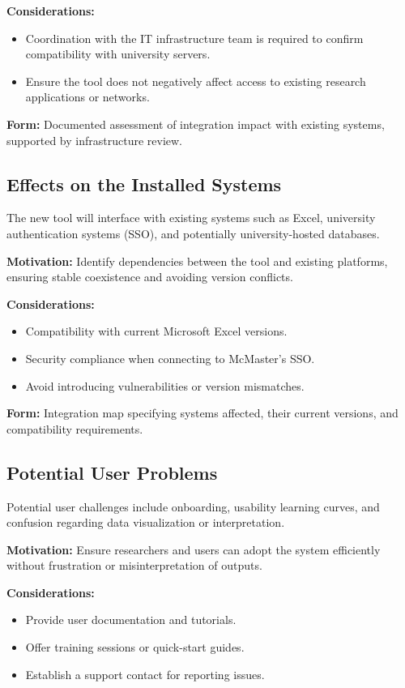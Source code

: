 \documentclass[12pt]{article}
\begin{document}
\textbf{Considerations:}
\begin{itemize}
    \item Coordination with the IT infrastructure team is required to confirm compatibility with university servers.
    \item Ensure the tool does not negatively affect access to existing research applications or networks.
\end{itemize}

\textbf{Form:} Documented assessment of integration impact with existing systems, supported by infrastructure review.

\subsection{Effects on the Installed Systems}

The new tool will interface with existing systems such as Excel, university authentication systems (SSO), and potentially university-hosted databases.

\textbf{Motivation:} Identify dependencies between the tool and existing platforms, ensuring stable coexistence and avoiding version conflicts.

\textbf{Considerations:}
\begin{itemize}
    \item Compatibility with current Microsoft Excel versions.
    \item Security compliance when connecting to McMaster’s SSO.
    \item Avoid introducing vulnerabilities or version mismatches.
\end{itemize}

\textbf{Form:} Integration map specifying systems affected, their current versions, and compatibility requirements.

\subsection{Potential User Problems}

Potential user challenges include onboarding, usability learning curves, and confusion regarding data visualization or interpretation.

\textbf{Motivation:} Ensure researchers and users can adopt the system efficiently without frustration or misinterpretation of outputs.

\textbf{Considerations:}
\begin{itemize}
    \item Provide user documentation and tutorials.
    \item Offer training sessions or quick-start guides.
    \item Establish a support contact for reporting issues.
\end{itemize}
\end{document}

